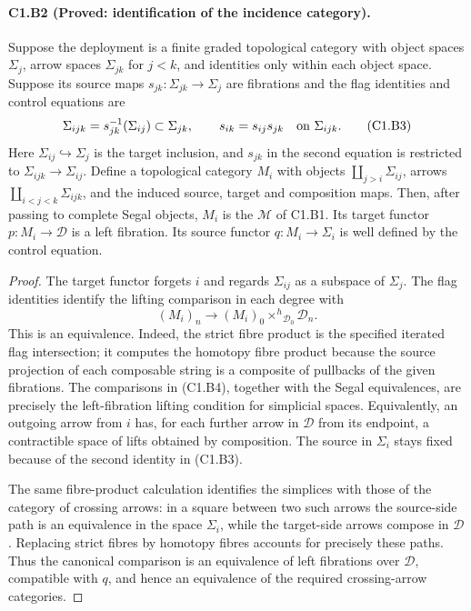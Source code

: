 \paragraph{C1.B2 (Proved: identification of the incidence category).}
Suppose the deployment is a finite graded topological category with
object spaces $\Sigma_j$, arrow spaces $\Sigma_{jk}$ for $j<k$,
and identities only within each object space. Suppose its source
maps $s_{jk}:\Sigma_{jk}\to\Sigma_j$ are fibrations and the flag
identities and control equations are
\[
 \Sigma_{ijk}=s_{jk}^{-1}(\Sigma_{ij})\subset\Sigma_{jk},
 \qquad s_{ik}=s_{ij}s_{jk}\quad\hbox{on }\Sigma_{ijk}.
 \tag{C1.B3}
\]
Here $\Sigma_{ij}\hookrightarrow\Sigma_j$ is the target inclusion,
and $s_{jk}$ in the second equation is restricted to
$\Sigma_{ijk}\to\Sigma_{ij}$. Define a topological category $M_i$
with objects $\coprod_{j>i}\Sigma_{ij}$, arrows
$\coprod_{i<j<k}\Sigma_{ijk}$, and the induced source, target and
composition maps. Then, after passing to complete Segal objects,
$M_i$ is the $\mathcal M$ of C1.B1. Its target functor
$p:M_i\to\mathcal D$ is a left fibration. Its source functor
$q:M_i\to\Sigma_i$ is well defined by the control equation.

\begin{proof}
The target functor forgets $i$ and regards $\Sigma_{ij}$ as a
subspace of $\Sigma_j$. The flag identities identify the lifting
comparison in each degree with
\[
 (M_i)_n\longrightarrow (M_i)_0
                  \mathbin{\times^h}_{\mathcal D_0}\mathcal D_n.
 \tag{C1.B4}
\]
This is an equivalence. Indeed, the strict fibre product is the
specified iterated flag intersection; it computes the homotopy
fibre product because the source projection of each composable
string is a composite of pullbacks of the given fibrations.
The comparisons in (C1.B4), together with the Segal equivalences,
are precisely the left-fibration lifting condition for simplicial
spaces. Equivalently, an outgoing arrow from $i$ has, for each
further arrow in $\mathcal D$ from its endpoint, a contractible
space of lifts obtained by composition. The source in $\Sigma_i$
stays fixed because of the second identity in (C1.B3).

The same fibre-product calculation identifies the simplices with
those of the category of crossing arrows: in a square between two
such arrows the source-side path is an equivalence in the space
$\Sigma_i$, while the target-side arrows compose in $\mathcal D$.
Replacing strict fibres by homotopy fibres accounts for precisely
these paths. Thus the canonical comparison is an equivalence of
left fibrations over $\mathcal D$, compatible with $q$, and hence
an equivalence of the required crossing-arrow categories.
\end{proof}

